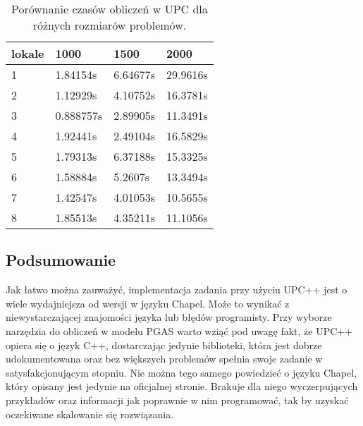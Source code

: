     \begin{table}[]
    \centering
    \begin{tabular}{l|l|l|l}
    \textbf{lokale} & \textbf{1000} & \textbf{1500} & \textbf{2000} \\ \hline
    1               & 1.84154s      & 6.64677s      & 29.9616s      \\
    2               & 1.12929s      & 4.10752s      & 16.3781s      \\
    3               & 0.888757s     & 2.89905s      & 11.3491s      \\
    4               & 1.92441s      & 2.49104s      & 16.5829s      \\
    5               & 1.79313s      & 6.37188s      & 15.3325s      \\
    6               & 1.58884s      & 5.2607s       & 13.3494s      \\
    7               & 1.42547s      & 4.01053s      & 10.5655s      \\
    8               & 1.85513s      & 4.35211s      & 11.1056s     
    \end{tabular}
    \caption{Porównanie czasów obliczeń w UPC dla różnych rozmiarów problemów.}
    \label{tab:matrixmulupc}
    \end{table}
    
    \subsection{Podsumowanie}
    Jak łatwo można zauważyć, implementacja zadania przy użyciu UPC++ jest o wiele wydajniejsza od wersji w języku Chapel.
    Może to wynikać z niewystarczającej znajomości języka lub błędów programisty.
    Przy wyborze narzędzia do obliczeń w modelu PGAS warto wziąć pod uwagę fakt, że UPC++ opiera się o język C++, dostarczając jedynie biblioteki, która jest dobrze udokumentowana oraz bez większych problemów spełnia swoje zadanie w satysfakcjonującym stopniu.
    Nie można tego samego powiedzieć o języku Chapel, który opisany jest jedynie na oficjalnej stronie.
    Brakuje dla niego wyczerpujących przykładów oraz informacji jak poprawnie w nim programować, tak by uzyskać oczekiwane skalowanie się rozwiązania.
